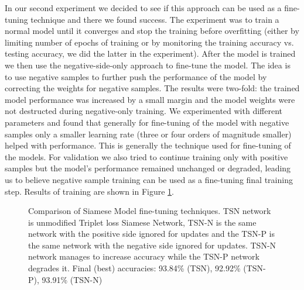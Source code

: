 \documentclass[b5paper]{book}
\begin{document}
In our second experiment we decided to see if this approach can be used as a fine-tuning technique and there we found success. The experiment was to train a normal model until it converges and stop the training before overfitting (either by limiting number of epochs of training or by monitoring the training accuracy vs. testing accuracy, we did the latter in the experiment). After the model is trained we then use the negative-side-only approach to fine-tune the model. The idea is to use negative samples to further push the performance of the model by correcting the weights for negative samples. The results were two-fold: the trained model performance was increased by a small margin and the model weights were not destructed during negative-only training. We experimented with different parameters and found that generally for fine-tuning of the model with negative samples only a smaller learning rate (three or four orders of magnitude smaller) helped with performance. This is generally the technique used for fine-tuning of the models. For validation we also tried to continue training only with positive samples but the model's performance remained unchanged or degraded, leading us to believe negative sample training can be used as a fine-tuning final training step. Results of training are shown in Figure \ref{fig:snn_chart}.

\begin{figure}
    \centering
    \caption{Comparison of Siamese Model fine-tuning techniques. TSN network is unmodified Triplet loss Siamese Network, TSN-N is the same network with the positive side ignored for updates and the TSN-P is the same network with the negative side ignored for updates. TSN-N network manages to increase accuracy while the TSN-P network degrades it. Final (best) accuracies: 93.84\% (TSN), 92.92\% (TSN-P), 93.91\% (TSN-N)}
    \label{fig:snn_chart}
\end{figure}
\end{document}
